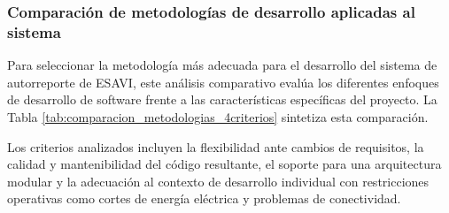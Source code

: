 \subsubsection{Comparación de metodologías de desarrollo aplicadas al sistema}
\label{subsection:comparacion_metodologias_sistema}

Para seleccionar la metodología más adecuada para el desarrollo del sistema de autorreporte de ESAVI, este análisis comparativo evalúa los diferentes enfoques de desarrollo de software frente a las características específicas del proyecto. La Tabla \ref{tab:comparacion_metodologias_4criterios} sintetiza esta comparación.

Los criterios analizados incluyen la flexibilidad ante cambios de requisitos, la calidad y mantenibilidad del código resultante, el soporte para una arquitectura modular y la adecuación al contexto de desarrollo individual con restricciones operativas como cortes de energía eléctrica y problemas de conectividad.


